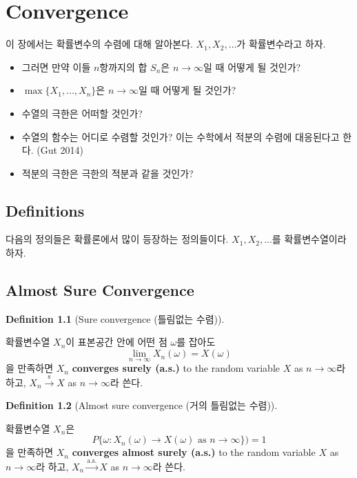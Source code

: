 \documentclass[
  letterpaper,
  DIV=11,
  numbers=noendperiod]{scrreprt}
\theoremstyle{plain}
\theoremstyle{definition}
\theoremstyle{definition}
\newtheorem{definition}{Definition}[chapter]
\theoremstyle{plain}
\theoremstyle{plain}
\theoremstyle{remark}
\begin{document}
\chapter{Convergence}\label{convergence}

이 장에서는 확률변수의 수렴에 대해 알아본다. \(X_1, X_2, \ldots\)가
확률변수라고 하자.

\begin{itemize}
\item
  그러면 만약 이들 \(n\)항까지의 합 \(S_n\)은 \(n\rightarrow\infty\)일
  때 어떻게 될 것인가?
\item
  \(\max \{X_1,\ldots, X_n\}\)은 \(n\rightarrow\infty\)일 때 어떻게 될
  것인가?
\item
  수열의 극한은 어떠할 것인가?
\item
  수열의 함수는 어디로 수렴할 것인가? 이는 수학에서 적분의 수렴에
  대응된다고 한다. (Gut 2014)
\item
  적분의 극한은 극한의 적분과 같을 것인가?
\end{itemize}

\section{Definitions}\label{definitions}

다음의 정의들은 확률론에서 많이 등장하는 정의들이다.
\(X_1,X_2,\ldots\)를 확률변수열이라 하자.

\section{Almost Sure Convergence}\label{almost-sure-convergence}

\begin{definition}[Sure convergence (틀림없는
수렴)]\protect\hypertarget{def-sconv}{}\label{def-sconv}

확률변수열 \(X_n\)이 표본공간 안에 어떤 점 \(\omega\)를 잡아도 \[
\lim_{n\rightarrow\infty} X_n (\omega) = X(\omega)
\] 을 만족하면 \(X_n\) \textbf{converges surely (a.s.)} to the random
variable \(X\) as \(n\rightarrow \infty\)라 하고,
\(X_n \stackrel{\text{s}}{\rightarrow}X\) as \(n\rightarrow \infty\)라
쓴다.

\end{definition}

\begin{definition}[Almost sure convergence (거의 틀림없는
수렴)]\protect\hypertarget{def-asconv}{}\label{def-asconv}

확률변수열 \(X_n\)은 \[
P\{ \omega: X_n (\omega)\rightarrow X(\omega) \text{ as } n\rightarrow \infty\})=1
\] 을 만족하면 \(X_n\) \textbf{converges almost surely (a.s.)} to the
random variable \(X\) as \(n\rightarrow \infty\)라 하고,
\(X_n \stackrel{\text{a.s.}}{\rightarrow}X\) as
\(n\rightarrow \infty\)라 쓴다.

\end{definition}
\end{document}
